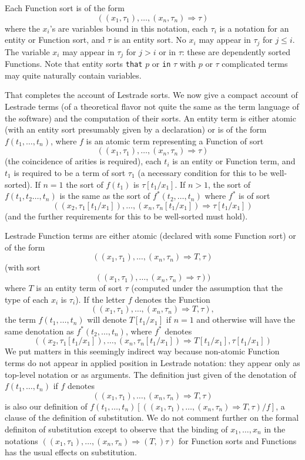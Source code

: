 \documentclass{article}
\begin{document}
Each Function sort is of the form $$((x_1,\tau_1),\ldots,(x_n,\tau_n) \Rightarrow \tau)$$  where the $x_i$'s are variables bound in this notation, each $\tau_i$ is a notation for an entity or Function sort, and $\tau$ is an entity sort.  No $x_i$ may appear in $\tau_j$ for $j\leq i$.  The variable $x_i$ may appear in $\tau_j$ for $j>i$ or in $\tau$:  these are dependently sorted Functions.  Note that entity sorts {\tt that} $p$ or {\tt in} $\tau$ with $p$ or $\tau$ complicated terms may quite naturally contain variables.

That completes the account of Lestrade sorts.  We now give a compact account of Lestrade terms (of a theoretical flavor not quite the same as the term language of the software) and the computation of their sorts.  An entity term is either atomic (with an entity  sort presumably given by a declaration) or is of the form $f(t_1,\ldots,t_n)$, where $f$ is an atomic term representing a Function of sort
$$((x_1,\tau_1),\ldots,(x_n,\tau_n) \Rightarrow \tau)$$ (the coincidence of arities is required), each $t_i$ is an entity or Function term, and $t_1$ is required to be a term of sort $\tau_1$ (a necessary condition for this to be well-sorted).  If $n=1$ the sort
of $f(t_1)$ is $\tau[t_1/x_1]$.  If $n>1$, the sort of $f(t_1,t_2\ldots,t_n)$ is the same as the sort of $f^*(t_2,\ldots,t_n)$ where $f^*$ is of sort
$$((x_2,\tau_1[t_1/x_1]),\ldots,(x_n,\tau_n[t_1/x_1]) \Rightarrow \tau[t_1/x_1])$$ (and the further requirements for this to be well-sorted must hold).

Lestrade Function terms are either atomic (declared with some Function sort) or of the form $$((x_1,\tau_1),\ldots,(x_n,\tau_n) \Rightarrow T,\tau)$$ (with sort  $$((x_1,\tau_1),\ldots,(x_n,\tau_n) \Rightarrow \tau))$$ where $T$ is an entity term of sort $\tau$ (computed under the assumption that the type of each $x_i$ is $\tau_i$).  If the letter $f$ denotes the Function $$((x_1,\tau_1),\ldots,(x_n,\tau_n) \Rightarrow T,\tau),$$
the term $f(t_1,\ldots,t_n)$ will denote $T[t_1/x_1]$ if $n=1$ and otherwise will have the same denotation as $f^*(t_2,\ldots,t_n)$, where $f^*$ denotes
$$((x_2,\tau_1[t_1/x_1]),\ldots,(x_n,\tau_n[t_1/x_1]) \Rightarrow T[t_1/x_1],\tau[t_1/x_1])$$  We put matters in this seemingly indirect way because non-atomic Function terms do not appear in applied position in Lestrade notation:  they appear only as top-level notation or as arguments.  The definition just
given of the denotation of  $f(t_1,\ldots,t_n)$ if $f$ denotes  $$((x_1,\tau_1),\ldots,(x_n,\tau_n) \Rightarrow T,\tau)$$ is also our definition of $f(t_1,\ldots,t_n)[((x_1,\tau_1),\ldots,(x_n,\tau_n) \Rightarrow T,\tau)/f]$, a clause of the definition of substitution.  We do not comment further on the formal definiton of substitution except to observe that the binding of $x_1,\ldots,x_n$ in the notations $((x_1,\tau_1),\ldots,(x_n,\tau_n) \Rightarrow (T,)\tau)$ for Function sorts and Functions has the usual effects on substitution.
\end{document}
